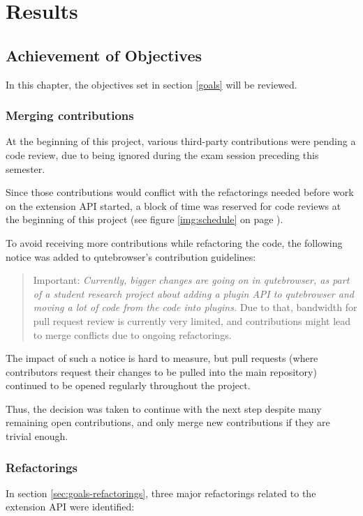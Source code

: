
\chapter{Results}
\label{ch:results}

\section{Achievement of Objectives}

In this chapter, the objectives set in section \ref{goals} will be reviewed.

\subsection{Merging contributions}
\label{sec:merging}
At the beginning of this project, various third-party contributions were pending
a code review, due to being ignored during the exam session preceding this
semester.

Since those contributions would conflict with the refactorings needed before
work on the extension API started, a block of time was reserved for code
reviews at the beginning of this project (see figure \ref{img:schedule} on page
\pageref{img:schedule}).

To avoid receiving more contributions while refactoring the code, the
following notice was added to qutebrowser's contribution guidelines:

\begin{quote}
Important: \emph{Currently, bigger changes are going on in qutebrowser, as
part of a student research project about adding a plugin API to qutebrowser
and moving a lot of code from the code into plugins.} Due to that, bandwidth
for pull request review is currently very limited, and contributions might lead
to merge conflicts due to ongoing refactorings.
\end{quote}

The impact of such a notice is hard to measure, but pull requests (where
contributors request their changes to be pulled into the main repository)
continued to be opened regularly throughout the project.

Thus, the decision was taken to continue with the next step despite many
remaining open contributions, and only merge new contributions if they are
trivial enough.

\subsection{Refactorings}
In section \ref{sec:goals-refactorings}, three major refactorings related to the
extension API were identified:

